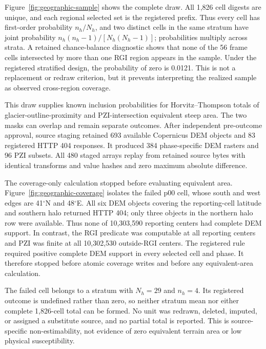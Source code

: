 \documentclass[11pt]{article}
\begin{document}
Figure~\ref{fig:geographic-sample} shows the complete draw. All 1,826 cell
digests are unique, and each regional selected set is the registered prefix.
Thus every cell has first-order probability $n_h/N_h$, and two distinct cells
in the same stratum have joint probability
$n_h(n_h-1)/[N_h(N_h-1)]$; probabilities multiply across strata. A retained
chance-balance diagnostic shows that none of the 56 frame cells intersected by
more than one RGI region appears in the sample. Under the registered stratified
design, the probability of zero is 0.0121. This is not a replacement or redraw
criterion, but it prevents interpreting the realized sample as observed
cross-region coverage.

This draw supplies known inclusion probabilities for Horvitz--Thompson totals
of glacier-outline-proximity and PZI-intersection equivalent steep area. The
two masks can overlap and remain separate outcomes. After independent
pre-outcome approval, source staging retained 693 available Copernicus DEM
objects and 83 registered HTTP 404 responses. It produced 384 phase-specific
DEM rasters and 96 PZI subsets. All 480 staged arrays replay from retained
source bytes with identical transforms and value hashes and zero maximum
absolute difference.

The coverage-only calculation stopped before evaluating equivalent area.
Figure~\ref{fig:geographic-coverage} isolates the failed p00 cell, whose south
and west edges are 41$^\circ$N and 48$^\circ$E. All six DEM objects covering
the reporting-cell latitude and southern halo returned HTTP 404; only three
objects in the northern halo row were available. Thus none of 10,303,590
reporting centers had complete DEM support. In contrast, the RGI predicate was
computable at all reporting centers and PZI was finite at all 10,302,530
outside-RGI centers. The registered rule required positive complete DEM
support in every selected cell and phase. It therefore stopped before atomic
coverage writes and before any equivalent-area calculation.

The failed cell belongs to a stratum with $N_h=29$ and $n_h=4$. Its registered
outcome is undefined rather than zero, so neither stratum mean nor either
complete 1,826-cell total can be formed. No unit was redrawn, deleted, imputed,
or assigned a substitute source, and no partial total is reported. This is
source-specific non-estimability, not evidence of zero equivalent terrain area
or low physical susceptibility.
\end{document}

